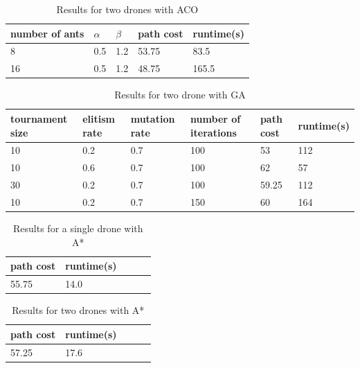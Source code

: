 \documentclass[conference]{IEEEtran}
\begin{document}
\begin{table}[H]
\centering
\begin{tabular}{ | m{1cm} | m{1cm}| m{1cm} | m{1.5cm} | m{1.5cm} |} 
\hline
number of ants & $\alpha$ & $\beta$ & path cost & runtime(s) \\ 
\hline
8 & 0.5 & 1.2 & 53.75 & 83.5 \\ 
\hline
16 & 0.5 & 1.2 & 48.75 & 165.5 \\ 
\hline
\end{tabular}
\caption{Results for two drones with ACO} \label{tab:double_aco}
\end{table}

\begin{table}[H]
\centering
\begin{tabular}{ | m{1.5cm} | m{1cm}| m{1cm} | m{1.5cm} | m{1.5cm} | m{1.5cm} |} 
\hline
tournament size & elitism rate & mutation rate & number of iterations & path cost & runtime(s) \\ 
\hline
10 & 0.2 & 0.7 & 100 & 53 & 112 \\ 
\hline
10 & 0.6 & 0.7 & 100 & 62 & 57  \\ 
\hline
30 & 0.2 & 0.7 & 100 & 59.25 & 112  \\ 
\hline
10 & 0.2 & 0.7 & 150 & 60 & 164  \\ 
\hline
\end{tabular}
\caption{Results for two drone with GA} \label{tab:double_ga}
\end{table}

\begin{table}[H]
\centering
\begin{tabular}{ | m{1cm} | m{1cm}| m{1cm} | m{1.5cm} | m{1.5cm} |} 
\hline
path cost & runtime(s) \\ 
\hline
55.75 & 14.0 \\
\hline
\end{tabular}
\caption{Results for a single drone with A*} \label{tab:single_a}
\end{table}

\begin{table}[H]
\centering
\begin{tabular}{ | m{1cm} | m{1cm}| m{1cm} | m{1.5cm} | m{1.5cm} |} 
\hline
path cost & runtime(s) \\ 
\hline
57.25 & 17.6 \\
\hline
\end{tabular}
\caption{Results for two drones with A*} \label{tab:double_a}
\end{table}
\end{document}
